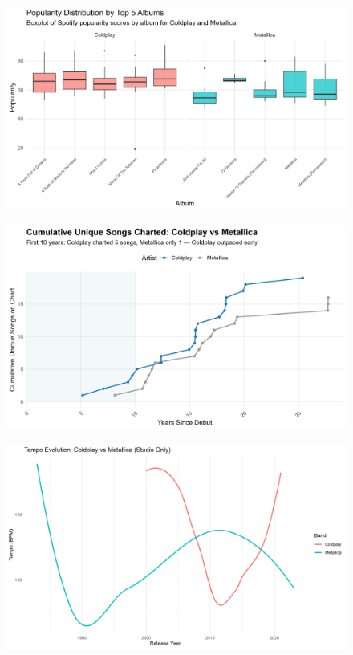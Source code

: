 \documentclass[
  man,floatsintext]{apa6}
\begin{document}
\begin{figure}

{\centering \includegraphics[width=0.9\linewidth]{../Question2/Results/popalbums} 

}

\caption{ }\label{fig:include-image-1}
\end{figure}
\begin{figure}

{\centering \includegraphics[width=0.9\linewidth]{../Question2/Results/uniquesongs} 

}

\caption{ }\label{fig:include-image-2}
\end{figure}
\begin{figure}

{\centering \includegraphics[width=0.9\linewidth]{../Question2/Results/audioeffects} 

}

\caption{ }\label{fig:include-image-3}
\end{figure}
\end{document}
